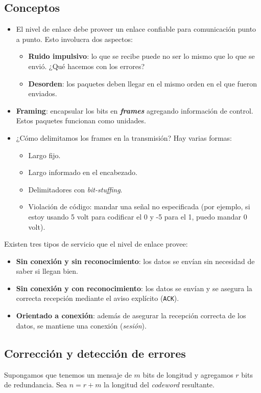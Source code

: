 \documentclass[]{article}
\begin{document}
\subsection{Conceptos}
\begin{itemize}
    \item El nivel de enlace debe proveer un enlace confiable para comunicación punto a punto. Esto involucra dos aspectos:
    \begin{itemize}
        \item \textbf{Ruido impulsivo}: lo que se recibe puede no ser lo mismo que lo que se envió. ¿Qué hacemos con los errores?
        \item \textbf{Desorden}: los paquetes deben llegar en el mismo orden en el que fueron enviados.
    \end{itemize}
    \item \textbf{Framing}: encapsular los bits en \textbf{\emph{frames}} agregando información de control. Estos paquetes funcionan como unidades.
    \item ¿Cómo delimitamos los frames en la transmisión? Hay varias formas:
    \begin{itemize}
        \item Largo fijo.
        \item Largo informado en el encabezado.
        \item Delimitadores con \emph{bit-stuffing}.
        \item Violación de código: mandar una señal no especificada (por ejemplo, si estoy usando 5 volt para codificar el 0 y -5 para el 1, puedo mandar 0 volt).
    \end{itemize}
\end{itemize}

Existen tres tipos de servicio que el nivel de enlace provee:
\begin{itemize}
    \item \textbf{Sin conexión y sin reconocimiento}: los datos se envían sin necesidad de saber si llegan bien.
    \item \textbf{Sin conexión y con reconocimiento}: los datos se envían y se asegura la correcta recepción mediante el aviso explícito (\texttt{ACK}).
    \item \textbf{Orientado a conexión}: además de asegurar la recepción correcta de los datos, se mantiene una conexión (\emph{sesión}).
\end{itemize}

\subsection{Corrección y detección de errores}
Supongamos que tenemos un mensaje de $m$ bits de longitud y agregamos $r$ bits de redundancia. Sea $n = r + m$ la longitud del \emph{codeword} resultante.
\end{document}
